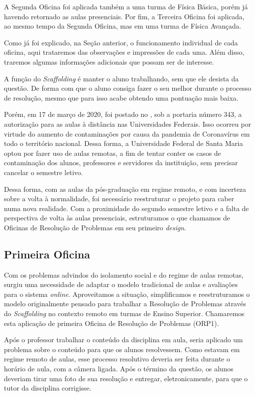 A Segunda Oficina foi aplicada também a uma turma de Física Básica, porém já havendo retornado as aulas presenciais. Por fim, a Terceira Oficina foi aplicada, ao mesmo tempo da Segunda Oficina, mas em uma turma de Física Avançada. 

Como já foi explicado, na Seção anterior, o funcionamento individual de cada oficina, aqui trataremos das observações e impressões de cada uma. Além disso, traremos algumas informações adicionais que possam ser de interesse. 

A função do \textit{Scaffolding} é manter o aluno trabalhando, sem que ele desista da questão. De forma com que o aluno consiga fazer o seu melhor durante o processo de resolução, mesmo que para isso acabe obtendo uma pontuação mais baixa.

Porém, em 17 de março de 2020, foi postado no , sob a portaria número 343, a autorização para as aulas à distância nas Universidades Federais. Isso ocorreu por virtude do aumento de contaminações por causa da pandemia de Coronavírus em todo o território nacional. Dessa forma, a Universidade Federal de Santa Maria optou por fazer uso de aulas remotas, a fim de tentar conter os casos de contaminação dos alunos, professores e servidores da instituição, sem precisar cancelar o semestre letivo. 

Dessa forma, com as aulas da pós-graduação em regime remoto, e com incerteza sobre a volta à normalidade, foi necessário reestruturar o projeto para caber numa nova realidade. Com a proximidade do segundo semestre letivo e a falta de perspectiva de volta às aulas presenciais, estruturamos o que chamamos de Oficinas de Resolução de Problemas em seu primeiro \textit{design}.

\subsection{Primeira Oficina} \label{subsec: primeiraof}

Com os problemas advindos do isolamento social e do regime de aulas remotas, surgiu uma necessidade de adaptar o modelo tradicional de aulas e avaliações para o sistema \textit{online}. Aproveitamos a situação, simplificamos e reestruturamos o modelo originalmente pensado para trabalhar a Resolução de Problemas através do \textit{Scaffolding} no contexto remoto em turmas de Ensino Superior. Chamaremos esta aplicação de primeira Oficina de Resolução de Problemas (ORP1).

Após o professor trabalhar o conteúdo da disciplina em aula, seria aplicado um problema sobre o conteúdo para que os alunos resolvessem. Como estavam em regime remoto de aulas, esse processo resolutivo deveria ser feita durante o horário de aula, com a câmera ligada. Após o término da questão, os alunos deveriam tirar uma foto de sua resolução e entregar, eletronicamente, para que o tutor da disciplina corrigisse.


